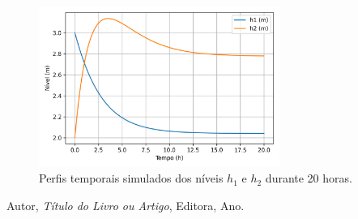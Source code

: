 \documentclass{article}
\begin{document}


\begin{figure}[h!]
  \centering
  \includegraphics[width=0.7\textwidth]{figuras/questao1_niveis.png}
  \caption{Perfis temporais simulados dos níveis $h_1$ e $h_2$ durante 20 horas.}
  \label{fig:questao1}
\end{figure}
\begin{thebibliography}{9}
  Autor, \emph{Título do Livro ou Artigo}, Editora, Ano.
\end{thebibliography}
\end{document}
